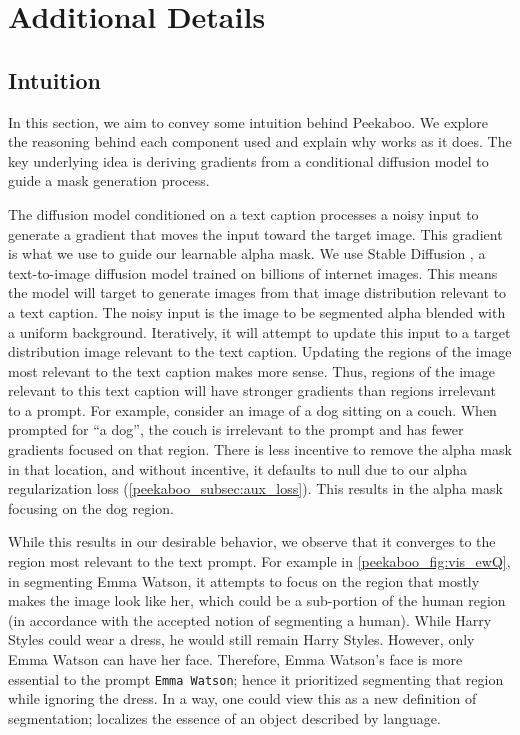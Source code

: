 \section{Additional Details}
\label{peekaboo_sec:additional_details}


\subsection{Intuition}
In this section, we aim to convey some intuition behind Peekaboo. We explore the reasoning behind each component used and 
explain
why \modelname works as it does. The key underlying idea is deriving gradients from a conditional diffusion model to guide a mask generation process. 

The diffusion model conditioned on a text caption processes a noisy input to generate a gradient that moves the input toward the target image. This gradient is what we use to guide our learnable alpha mask.
We use Stable Diffusion \cite{Rombach2022HighResolutionIS}, a text-to-image diffusion model trained on billions of internet images. %
This means the model will target to generate images from that image distribution relevant to a text caption. 
The noisy input is the image to be segmented alpha blended with a uniform background. 
Iteratively, it will attempt to update this input to a target distribution image relevant to the text caption. 
Updating the regions of the image most relevant to the text caption makes more sense.
Thus, regions of the image relevant to this text caption will have stronger gradients than regions irrelevant to a prompt. 
For example, consider an image of a dog sitting on a couch. When prompted for ``a dog'', the couch is irrelevant to the prompt and has fewer gradients focused on that region. There is less incentive to remove the alpha mask in that location, and without incentive, it defaults to null due to our alpha regularization loss (\cref{peekaboo_subsec:aux_loss}). This results in the alpha mask focusing on the dog region. 

While this results in our desirable behavior, we observe that it converges to the region most relevant to the text prompt. For example in \cref{peekaboo_fig:vis_ewQ}, in segmenting Emma Watson, it attempts to focus on the region that mostly makes the image look like her, which could be a sub-portion of the human region (in accordance with the accepted notion of segmenting a human).
While Harry Styles could wear a dress, he would still remain Harry Styles. However, only Emma Watson can have her face. Therefore, Emma Watson's face is more essential to the prompt \texttt{Emma Watson}; hence it prioritized segmenting that region while ignoring the dress. 
% 
In a way, one could view this as a new definition of segmentation; \modelname localizes the essence of an object described by language. 

